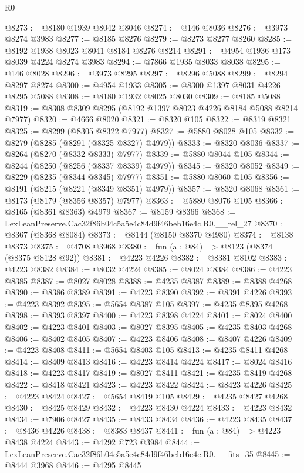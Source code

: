 \begin{lexlean}{R0}
\begin{coremodule}
@8273 := @8180 @1939 @8042 @8046
@8274 := @146 @8036
@8276 := @3973 @8274 @3983
@8277 := @8185 @8276
@8279 := @8273 @8277 @8260
@8285 := @8192 @1938 @8023 @8041 @8184 @8276 @8214
@8291 := @4954 @1936 @173 @8039 @4224 @8274 @3983
@8294 := @7866 @1935 @8033 @8038
@8295 := @146 @8028
@8296 := @3973 @8295
@8297 := @8296 @5088
@8299 := @8294 @8297 @8274
@8300 := @4954 @1933
@8305 := @8300 @1397 @8031 @4226 @8295 @5088
@8308 := @8180 @1932 @8025 @8030
@8309 := @8185 @5088
@8319 := @8308 @8309 @8295 (@8192 @1397 @8023 @4226 @8184 @5088 @8214 @7977)
@8320 := @4666 @8020
@8321 := @8320 @105
@8322 := @8319 @8321
@8325 := @8299 (@8305 @8322 @7977)
@8327 := @5880 @8028 @105
@8332 := @8279 (@8285 (@8291 (@8325 @8327) @4979))
@8333 := @8320 @8036
@8337 := @8264 (@8270 (@8332 @8333) @7977)
@8339 := @5880 @8044 @105
@8344 := @8244 (@8250 (@8256 (@8337 @8339) @4979))
@8345 := @8320 @8052
@8349 := @8229 (@8235 (@8344 @8345) @7977)
@8351 := @5880 @8060 @105
@8356 := @8191 (@8215 (@8221 (@8349 @8351) @4979))
@8357 := @8320 @8068
@8361 := @8173 (@8179 (@8356 @8357) @7977)
@8363 := @5880 @8076 @105
@8366 := @8165 (@8361 @8363) @4979
@8367 := @8159 @8366
@8368 := LexLeanPreserve.Cac32f86b04c5a5e4c84d9f46beb16e4c.R0.__rel_27
@8370 := @8367 (@8368 @8084)
@8373 := @8144 (@8150 @8370 @4980)
@8374 := @8138 @8373
@8375 := @4708 @3968
@8380 := fun (a : @84) => @8123 (@8374 (@8375 @8128 @92))
@8381 := @4223 @4226
@8382 := @8381 @8102
@8383 := @4223 @8382
@8384 := @8032 @4224
@8385 := @8024 @8384
@8386 := @4223 @8385
@8387 := @8027 @8028
@8388 := @4235 @8387
@8389 := @8388 @4268
@8390 := @8386 @8389
@8391 := @4223 @8390
@8392 := @8391 @4226
@8393 := @4223 @8392
@8395 := @5654 @8387 @105
@8397 := @4235 @8395 @4268
@8398 := @8393 @8397
@8400 := @4223 @8398 @4224
@8401 := @8024 @8400
@8402 := @4223 @8401
@8403 := @8027 @8395
@8405 := @4235 @8403 @4268
@8406 := @8402 @8405
@8407 := @4223 @8406
@8408 := @8407 @4226
@8409 := @4223 @8408
@8411 := @5654 @8403 @105
@8413 := @4235 @8411 @4268
@8414 := @8409 @8413
@8416 := @4223 @8414 @4224
@8417 := @8024 @8416
@8418 := @4223 @8417
@8419 := @8027 @8411
@8421 := @4235 @8419 @4268
@8422 := @8418 @8421
@8423 := @4223 @8422
@8424 := @8423 @4226
@8425 := @4223 @8424
@8427 := @5654 @8419 @105
@8429 := @4235 @8427 @4268
@8430 := @8425 @8429
@8432 := @4223 @8430 @4224
@8433 := @4223 @8432
@8434 := @7906 @8427
@8435 := @8433 @8434
@8436 := @4223 @8435
@8437 := @8436 @4226
@8438 := @8383 @8437
@8441 := fun (a : @84) => @4223 @8438 @4224
@8443 := @4292 @723 @3984
@8444 := LexLeanPreserve.Cac32f86b04c5a5e4c84d9f46beb16e4c.R0.__fits_35
@8445 := @8444 @3968
@8446 := @4295 @8445

\end{coremodule}
\end{lexlean}
